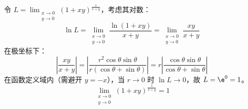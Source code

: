 \begin{solution}
    令 $L = \lim_{\substack{x \to 0 \\ y \to 0}} (1 + xy)^{\frac{1}{x+y}}$，考虑其对数：
    \begin{equation*}
        \ln L = \lim_{\substack{x \to 0 \\ y \to 0}} \frac{\ln(1+xy)}{x+y} = \lim_{\substack{x \to 0 \\ y \to 0}} \frac{xy}{x+y}
    \end{equation*}
    在极坐标下：
    \begin{equation*}
        \left| \frac{xy}{x+y} \right| = \left| \frac{r^2 \cos \theta \sin \theta}{r(\cos \theta + \sin \theta)} \right| = r \left| \frac{\cos \theta \sin \theta}{\cos \theta + \sin \theta} \right|
    \end{equation*}
    在函数定义域内（需避开 $y=-x$），当 $r \to 0$ 时 $\ln L \to 0$，故 $L = \e^0 = 1$。
    \begin{equation*}
        \boxed{\lim_{\substack{x \to 0 \\ y \to 0}} (1 + xy)^{\frac{1}{x+y}} = 1}
    \end{equation*}
\end{solution}
